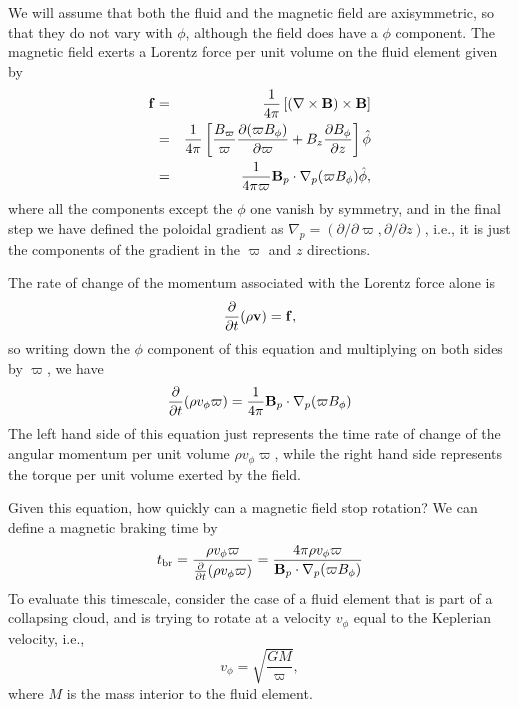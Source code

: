 We will assume that both the fluid and the magnetic field are axisymmetric, so that they do not vary with $\phi$, although the field does have a $\phi$ component. The magnetic field exerts a Lorentz force per unit volume on the fluid element given by
\begin{eqnarray}
\mathbf{f} & = & \frac{1}{4\pi} \left[(\nabla\times\mathbf{B})\times \mathbf{B}\right] \\
& = & \frac{1}{4\pi} \left[\frac{B_\varpi}{\varpi} \frac{\partial(\varpi B_\phi)}{\partial \varpi} + B_z  \frac{\partial B_\phi}{\partial z}\right] \hat{\phi}\\
& = & \frac{1}{4\pi\varpi} \mathbf{B}_p \cdot \nabla_p (\varpi B_{\phi}) \hat{\phi},
\end{eqnarray}
where all the components except the $\phi$ one vanish by symmetry, and in the final step we have defined the poloidal gradient as $\nabla_p = (\partial/\partial\varpi, \partial/\partial z)$, i.e., it is just the components of the gradient in the $\varpi$ and $z$ directions.

The rate of change of the momentum associated with the Lorentz force alone is
\begin{equation}
\frac{\partial}{\partial t}(\rho \mathbf{v}) = \mathbf{f},
\end{equation}
so writing down the $\phi$ component of this equation and multiplying on both sides by $\varpi$, we have
\begin{equation}
\frac{\partial}{\partial t} (\rho v_{\phi} \varpi) = \frac{1}{4\pi} \mathbf{B}_p\cdot\nabla_p(\varpi B_\phi)
\end{equation}
The left hand side of this equation just represents the time rate of change of the angular momentum per unit volume $\rho v_{\phi} \varpi$, while the right hand side represents the torque per unit volume exerted by the field.

Given this equation, how quickly can a magnetic field stop rotation? We can define a magnetic braking time by
\begin{equation}
t_{\rm br} = \frac{\rho v_{\phi} \varpi}{\frac{\partial}{\partial t} (\rho v_{\phi} \varpi)}
= \frac{4 \pi \rho v_{\phi} \varpi}{\mathbf{B}_p \cdot\nabla_p (\varpi B_\phi)}
\end{equation}
To evaluate this timescale, consider the case of a fluid element that is part of a collapsing cloud, and is trying to rotate at a velocity $v_{\phi}$ equal to the Keplerian velocity, i.e.,
\begin{equation}
v_{\phi} = \sqrt{\frac{GM}{\varpi}},
\end{equation}
where $M$ is the mass interior to the fluid element.


